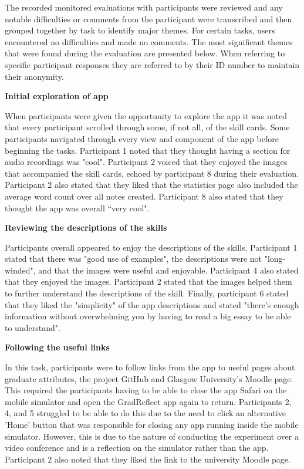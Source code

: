 \documentclass{l4proj}
\begin{document}
The recorded monitored evaluations with participants were reviewed and any notable difficulties or comments from the participant were transcribed and then grouped together by task to identify major themes. For certain tasks, users encountered no difficulties and made no comments. The most significant themes that were found during the evaluation are presented below. When referring to specific participant responses they are referred to by their ID number to maintain their anonymity.

\textbf{Initial exploration of app}

When participants were given the opportunity to explore the app it was noted that every participant scrolled through some, if not all, of the skill cards. Some participants navigated through every view and component of the app before beginning the tasks. Participant 1 noted that they thought having a section for audio recordings was "cool". Participant 2 voiced that they enjoyed the images that accompanied the skill cards, echoed by participant 8 during their evaluation. Participant 2 also stated that they liked that the statistics page also included the average word count over all notes created. Participant 8 also stated that they thought the app was overall “very cool".

\textbf{Reviewing the descriptions of the skills}

Participants overall appeared to enjoy the descriptions of the skills. Participant 1 stated that there was "good use of examples", the descriptions were not "long-winded", and that the images were useful and enjoyable. Participant 4 also stated that they enjoyed the images. Participant 2 stated that the images helped them to further understand the descriptions of the skill. Finally, participant 6 stated that they liked the "simplicity" of the app descriptions and stated "there's enough information without overwhelming you by having to read a big essay to be able to understand".


\textbf{Following the useful links}

In this task, participants were to follow links from the app to useful pages about graduate attributes, the project GitHub and Glasgow University's Moodle page. This required the participants having to be able to close the app Safari on the mobile simulator and open the GradReflect app again to return. Participants 2, 4, and 5 struggled to be able to do this due to the need to click an alternative 'Home' button that was responsible for closing any app running inside the mobile simulator. However, this is due to the nature of conducting the experiment over a video conference and is a reflection on the simulator rather than the app. Participant 2 also noted that they liked the link to the university Moodle page.
\end{document}
